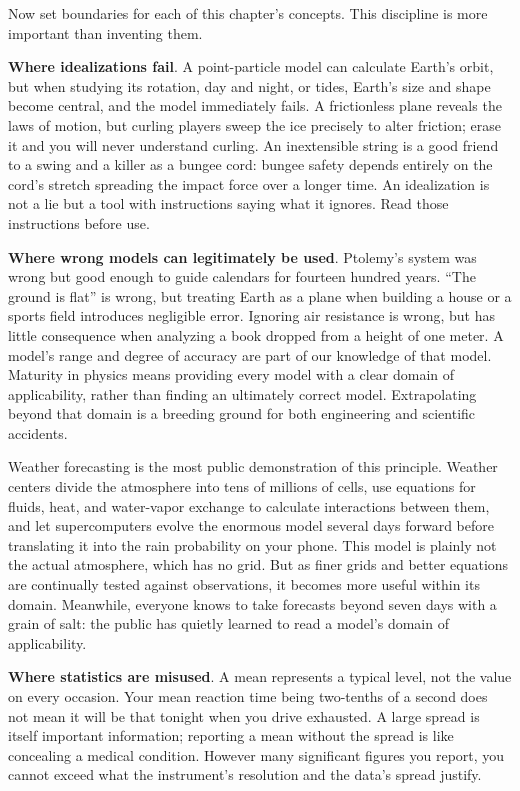 Now set boundaries for each of this chapter's concepts. This discipline is more important than inventing them.

\textbf{Where idealizations fail}. A point-particle model can calculate Earth's orbit, but when studying its rotation, day and night, or tides, Earth's size and shape become central, and the model immediately fails. A frictionless plane reveals the laws of motion, but curling players sweep the ice precisely to alter friction; erase it and you will never understand curling. An inextensible string is a good friend to a swing and a killer as a bungee cord: bungee safety depends entirely on the cord's stretch spreading the impact force over a longer time. An idealization is not a lie but a tool with instructions saying what it ignores. Read those instructions before use.

\textbf{Where wrong models can legitimately be used}. Ptolemy's system was wrong but good enough to guide calendars for fourteen hundred years. ``The ground is flat'' is wrong, but treating Earth as a plane when building a house or a sports field introduces negligible error. Ignoring air resistance is wrong, but has little consequence when analyzing a book dropped from a height of one meter. A model's range and degree of accuracy are part of our knowledge of that model. Maturity in physics means providing every model with a clear domain of applicability, rather than finding an ultimately correct model. Extrapolating beyond that domain is a breeding ground for both engineering and scientific accidents.

Weather forecasting is the most public demonstration of this principle. Weather centers divide the atmosphere into tens of millions of cells, use equations for fluids, heat, and water-vapor exchange to calculate interactions between them, and let supercomputers evolve the enormous model several days forward before translating it into the rain probability on your phone. This model is plainly not the actual atmosphere, which has no grid. But as finer grids and better equations are continually tested against observations, it becomes more useful within its domain. Meanwhile, everyone knows to take forecasts beyond seven days with a grain of salt: the public has quietly learned to read a model's domain of applicability.

\textbf{Where statistics are misused}. A mean represents a typical level, not the value on every occasion. Your mean reaction time being two-tenths of a second does not mean it will be that tonight when you drive exhausted. A large spread is itself important information; reporting a mean without the spread is like concealing a medical condition. However many significant figures you report, you cannot exceed what the instrument's resolution and the data's spread justify.

